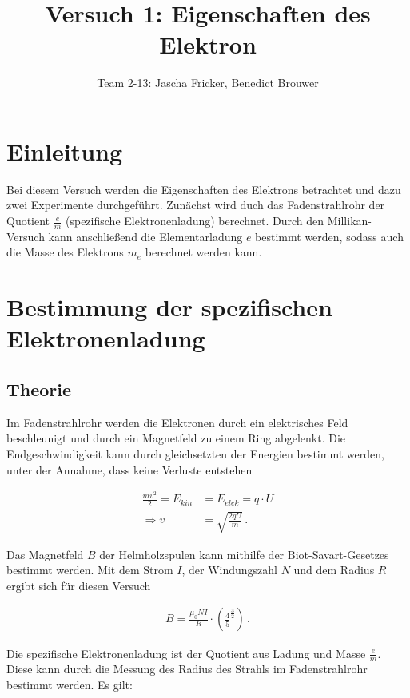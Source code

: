 \documentclass[11pt, a4paper]{article}
\title{Versuch 1: Eigenschaften des Elektron}
\author{Team 2-13: Jascha Fricker, Benedict Brouwer}
\begin{document}
    \maketitle


    \tableofcontents

    \newpage

    \section{Einleitung}

    Bei diesem Versuch werden die Eigenschaften des Elektrons betrachtet und dazu zwei Experimente durchgeführt. Zunächst wird duch das Fadenstrahlrohr
    der Quotient $\frac{e}{m}$ (spezifische Elektronenladung) berechnet. Durch den Millikan-Versuch kann anschließend die Elementarladung $e$ bestimmt
    werden, sodass auch die Masse des Elektrons $m_e$ berechnet werden kann.

    \section{Bestimmung der spezifischen Elektronenladung}

    \subsection{Theorie}

    Im Fadenstrahlrohr werden die Elektronen durch ein elektrisches Feld beschleunigt und durch ein Magnetfeld zu einem Ring abgelenkt. Die Endgeschwindigkeit kann durch gleichsetzten der Energien bestimmt werden, unter der Annahme, dass keine Verluste entstehen

    \begin{align}
    \frac{mv^2}{2} = E_{kin} &= E_{elek} = q \cdot U \label{geschw}\\
    \Rightarrow v &= \sqrt{\frac{2qU}{m}} \,.
    \end{align}
    
    Das Magnetfeld $B$ der Helmholzspulen kann mithilfe der Biot-Savart-Gesetzes bestimmt werden.
    Mit dem Strom $I$, der Windungszahl $N$ und dem Radius $R$ ergibt sich für diesen Versuch

    \begin{align}
        B = \frac{\mu_0 N I}{R} \cdot \left(\frac{4}{5}^{\frac{3}{2}}\right) \label{B-Helm} \,.
    \end{align}

    Die spezifische Elektronenladung ist der Quotient aus Ladung und Masse $\frac{e}{m}$.
    Diese kann durch die Messung des Radius des Strahls im Fadenstrahlrohr bestimmt werden. Es gilt:
\end{document}
